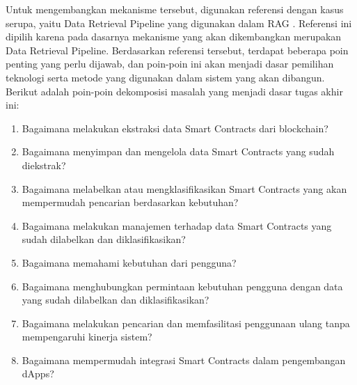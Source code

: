 
Untuk mengembangkan mekanisme tersebut, digunakan referensi dengan kasus serupa, yaitu Data Retrieval Pipeline yang digunakan dalam RAG \parencite{CrateDB_RAG_Pipelines}. Referensi ini dipilih karena pada dasarnya mekanisme yang akan dikembangkan merupakan Data Retrieval Pipeline. Berdasarkan referensi tersebut, terdapat beberapa poin penting yang perlu dijawab, dan poin-poin ini akan menjadi dasar pemilihan teknologi serta metode yang digunakan dalam sistem yang akan dibangun. Berikut adalah poin-poin dekomposisi masalah yang menjadi dasar tugas akhir ini:

\begin{enumerate}
	\item Bagaimana melakukan ekstraksi data Smart Contracts dari blockchain?
	
	\item Bagaimana menyimpan dan mengelola data Smart Contracts yang sudah diekstrak?
	
	\item Bagaimana melabelkan atau mengklasifikasikan Smart Contracts yang akan mempermudah pencarian berdasarkan kebutuhan?
	
	\item Bagaimana melakukan manajemen terhadap data Smart Contracts yang sudah dilabelkan dan diklasifikasikan?
	
	\item Bagaimana memahami kebutuhan dari pengguna?
	
	\item Bagaimana menghubungkan permintaan kebutuhan pengguna dengan data yang sudah dilabelkan dan diklasifikasikan?
	
	\item Bagaimana melakukan pencarian dan memfasilitasi penggunaan ulang tanpa mempengaruhi kinerja sistem?
	
	\item Bagaimana mempermudah integrasi Smart Contracts dalam pengembangan dApps?
\end{enumerate}
